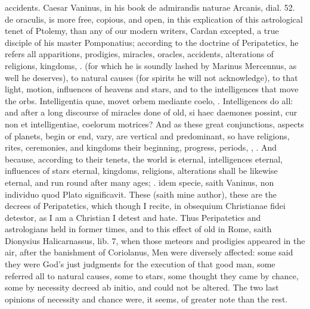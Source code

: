 {accidents. Caesar Vaninus, in his book de admirandis naturae Arcanis,
dial. 52. de oraculis, is more free, copious, and open, in this
explication of this astrological tenet of Ptolemy, than any of our
modern writers, Cardan excepted, a true disciple of his master
Pomponatius; according to the doctrine of Peripatetics, he refers all
apparitions, prodigies, miracles, oracles, accidents, alterations of
religions, kingdoms, \etc{}. (for which he is soundly lashed by Marinus
Mercennus, as well he deserves), to natural causes (for spirits he will
not acknowledge), to that light, motion, influences of heavens and
stars, and to the intelligences that move the orbs. Intelligentia quae,
movet orbem mediante coelo, \etc{}. Intelligences do all: and after a long
discourse of miracles done of old, si haec daemones possint, cur non et
intelligentiae, coelorum motrices? And as these great conjunctions,
aspects of planets, begin or end, vary, are vertical and predominant,
so have religions, rites, ceremonies, and kingdoms their beginning,
progress, periods, , \etc{}. And because, according to their tenets, the world
is eternal, intelligences eternal, influences of stars eternal,
kingdoms, religions, alterations shall be likewise eternal, and run
round after many ages;  \etc{}. idem specie, saith Vaninus, non individuo quod
Plato significavit. These (saith mine author), these are the
decrees of Peripatetics, which though I recite, in obsequium
Christianae fidei detestor, as I am a Christian I detest and hate. Thus
Peripatetics and astrologians held in former times, and to this effect
of old in Rome, saith Dionysius Halicarnassus, lib. 7, when those
meteors and prodigies appeared in the air, after the banishment of
Coriolanus,  Men were diversely affected: some said they were
God's just judgments for the execution of that good man, some referred
all to natural causes, some to stars, some thought they came by chance,
some by necessity decreed ab initio, and could not be altered. The two
last opinions of necessity and chance were, it seems, of greater note
than the rest.

}
